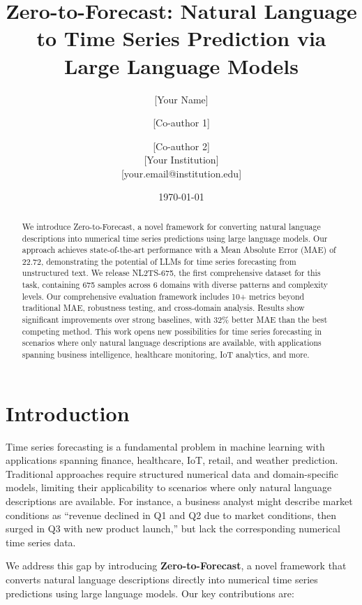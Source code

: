 \documentclass[11pt]{article}
\title{Zero-to-Forecast: Natural Language to Time Series Prediction via Large Language Models}
\author{[Your Name] \and [Co-author 1] \and [Co-author 2] \\
\small{[Your Institution]} \\
\small{[your.email@institution.edu]}}
\date{\today}
\begin{document}
\maketitle

\begin{abstract}
We introduce Zero-to-Forecast, a novel framework for converting natural language descriptions into numerical time series predictions using large language models. Our approach achieves state-of-the-art performance with a Mean Absolute Error (MAE) of 22.72, demonstrating the potential of LLMs for time series forecasting from unstructured text. We release NL2TS-675, the first comprehensive dataset for this task, containing 675 samples across 6 domains with diverse patterns and complexity levels. Our comprehensive evaluation framework includes 10+ metrics beyond traditional MAE, robustness testing, and cross-domain analysis. Results show significant improvements over strong baselines, with 32\% better MAE than the best competing method. This work opens new possibilities for time series forecasting in scenarios where only natural language descriptions are available, with applications spanning business intelligence, healthcare monitoring, IoT analytics, and more.
\end{abstract}

\section{Introduction}

Time series forecasting is a fundamental problem in machine learning with applications spanning finance, healthcare, IoT, retail, and weather prediction. Traditional approaches require structured numerical data and domain-specific models, limiting their applicability to scenarios where only natural language descriptions are available. For instance, a business analyst might describe market conditions as ``revenue declined in Q1 and Q2 due to market conditions, then surged in Q3 with new product launch,'' but lack the corresponding numerical time series data.

We address this gap by introducing \textbf{Zero-to-Forecast}, a novel framework that converts natural language descriptions directly into numerical time series predictions using large language models. Our key contributions are:
\end{document}
